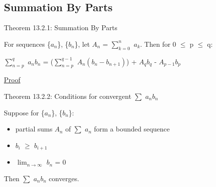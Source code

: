 \subsection{ Summation By Parts }

{ \color{red} Theorem 13.2.1: Summation By Parts }

    \begin{adjustbox}{minipage=14cm, right, vspace=0.1cm 0cm}
        For sequences \{$a_n$\}, \{$b_n$\}, let $A_n$ = $\sum_{k=0}^n$ $a_k$.
        Then for 0 $\leq$ p $\leq$ q:

        \hspace{1cm}
        $\sum_{n = p}^q$ $a_n b_n$
        = ($\sum_{n = p}^{q-1}$ $A_n (b_n - b_{n+1})$)
        + $A_q b_q$ - $A_{p-1} b_p$
    \end{adjustbox}

{ \color{magenta} \underline{Proof} }


    \vspace{0.5cm}

{ \color{red} Theorem 13.2.2: Conditions for convergent $\sum$ $a_n b_n$ }

    \begin{adjustbox}{minipage=14cm, right, vspace=0.1cm 0cm}
        Suppose for \{$a_n$\}, \{$b_n$\}:

        \begin{itemize}[leftmargin=1cm, itemsep=0.1cm]
            \item partial sums $A_n$ of $\sum$ $a_n$ form a bounded sequence
            
            \item $b_i$ $\geq$ $b_{i+1}$
            
            \item $\lim_{n \rightarrow \infty}$ $b_n$ = 0
        \end{itemize}

        Then $\sum$ $a_n b_n$ converges.
    \end{adjustbox}

